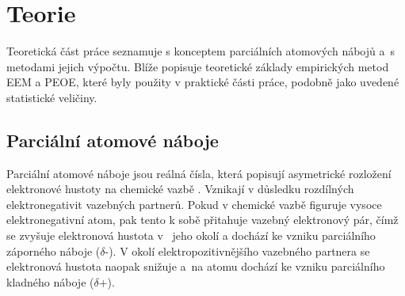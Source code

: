 \chapter{Teorie}

% 
% 
% 
% 
% 
Teoretická část práce seznamuje s konceptem parciálních atomových nábojů a~s metodami jejich výpočtu. Blíže popisuje teoretické základy empirických metod EEM a PEOE, které byly použity v praktické části práce, podobně jako uvedené statistické veličiny.

\section{Parciální atomové náboje}

Parciální atomové náboje jsou reálná čísla, která popisují asymetrické rozložení elek\-tronové hustoty na chemické vazbě \cite{Atkins}. Vznikají v důsledku rozdílných elektronegativit vazebných partnerů. Pokud v chemické vazbě figuruje vysoce elektronegativní atom, pak tento k sobě přitahuje vazebný elektronový pár, čímž se zvyšuje elektronová hustota v~ jeho okolí a dochází ke vzniku parciálního záporného náboje ($\delta$-). V okolí elektropozitivnějšího vazebného partnera se elektronová hustota naopak snižuje a~na atomu dochází ke vzniku parciálního kladného náboje ($\delta$+). 

